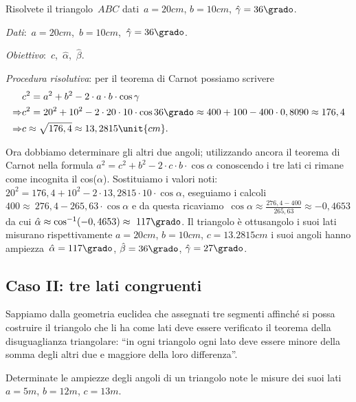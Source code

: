 \begin{problema}
Risolvete il triangolo~$ABC$ dati~$a= 20\unit{cm}$, $b=10\unit{cm}$, 
${\hat{\gamma}}=36\grado$.
\end{problema}

\emph{Dati}:~$a= 
20\unit{cm}$,\quad~$b=10\unit{cm}$,\quad~${\hat{\gamma}}=36\grado$.

\emph{Obiettivo}:~$c$,\quad~$\hat{\alpha}$,\quad~$\hat{\beta}$.

\emph{Procedura risolutiva}:
per il teorema di Carnot possiamo scrivere
\begin{align*}
&c^{2}=a^{2}+b^{2}-2\cdot a\cdot b\cdot \cos  \gamma\\
\Rightarrow &c^{2}=20^{2}+10^{2}-2\cdot 20\cdot 10\cdot 
\cos 36\grado \approx400+100-400\cdot 0,8090\approx176,4\\
\Rightarrow &c\approx\sqrt{176,4}\approx13,2815\unit{cm}.
\end{align*}

Ora dobbiamo determinare gli altri due angoli; utilizzando ancora il teorema di 
Carnot nella formula
$a^{2}=c^{2}+b^{2}-2\cdot c\cdot b\cdot \cos  \alpha$ 
conoscendo i tre lati ci rimane come incognita il cos(${\alpha}$). 
Sostituiamo i valori noti:~$20^{2}=176,4+10^{2}-2\cdot 
13,2815\cdot 10\cdot \cos  \alpha$, eseguiamo i calcoli
$400\approx~276,4-265,63\cdot \cos  \alpha$ e da questa ricaviamo~$\cos  
\alpha\approx \frac{276,4-400}{265,63}\approx-0,4653$ da cui
$\hat{\alpha}\approx\cos ^{-1}(-0,4653)\approx~117\grado$. Il triangolo è 
ottusangolo i suoi lati misurano rispettivamente
$a=20\unit{cm}$, $b=10\unit{cm}$, $c=13.2815\unit{cm}$ i suoi angoli hanno 
ampiezza~$\hat{\alpha} =117\grado$, $\hat{\beta} =36\grado$, $\hat{\gamma} 
=27\grado$.

\subsection{Caso II: tre lati congruenti}
Sappiamo dalla geometria euclidea che assegnati tre segmenti affinché si possa 
costruire il triangolo che li ha come lati
deve essere verificato il teorema della disuguaglianza triangolare: ``in ogni 
triangolo ogni lato deve essere minore della somma
degli altri due e maggiore della loro differenza''.

\begin{problema}
Determinate le ampiezze degli angoli di un triangolo note le misure dei suoi 
lati~$a=5\unit{m}$, $b=12\unit{m}$, $c=13\unit{m}$.
\end{problema}

